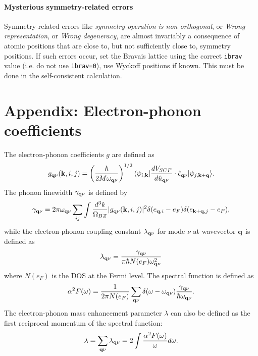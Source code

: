\documentclass[12pt,a4paper]{article}
\begin{document}
\paragraph{Mysterious symmetry-related errors} 
Symmetry-related errors like {\em symmetry operation is non orthogonal}, 
or {\em Wrong representation}, or {\em Wrong degeneracy}, are almost 
invariably a consequence of atomic positions that are close to, 
but not sufficiently close to, symmetry positions. If such errors occur,
set the Bravais lattice using the correct \texttt{ibrav} value (i.e. do
not use \texttt{ibrav=0}), use Wyckoff positions if known. This must be
done in the self-consistent calculation.

\appendix
\section{Appendix: Electron-phonon coefficients}

\def\r{{\bf r}}
\def\d{{\bf d}}
\def\k{{\bf k}}
\def\q{{\bf q}}
\def\G{{\bf G}}
\def\R{{\bf R}}

\noindent The electron-phonon coefficients $g$
are defined as
\begin{equation}
g_{\q\nu}(\k,i,j) =\left({\hbar\over 2M\omega_{\q\nu}}\right)^{1/2}
\langle\psi_{i,\k}| {dV_{SCF}\over d {\hat u}_{\q\nu} }\cdot
                   \hat \epsilon_{\q\nu}|\psi_{j,\k+\q}\rangle.
\end{equation}
The phonon linewidth $\gamma_{\q\nu}$ is defined by
\begin{equation}
\gamma_{\q\nu} = 2\pi\omega_{\q\nu} \sum_{ij}
                \int {d^3k\over \Omega_{BZ}}  |g_{\q\nu}(\k,i,j)|^2
                    \delta(e_{\q,i} - e_F)  \delta(e_{\k+\q,j} - e_F), 
\end{equation}
while the electron-phonon coupling constant $\lambda_{\q\nu}$ for
mode $\nu$ at wavevector $\q$ is defined as
\begin{equation}
\lambda_{\q\nu} ={\gamma_{\q\nu} \over \pi\hbar N(e_F)\omega^2_{\q\nu}}
\end{equation}
where $N(e_F)$ is the DOS at the Fermi level.
The spectral function is defined as
\begin{equation}
\alpha^2F(\omega) = {1\over 2\pi N(e_F)}\sum_{\q\nu} 
                    \delta(\omega-\omega_{\q\nu})
                    {\gamma_{\q\nu}\over\hbar\omega_{\q\nu}}.
\end{equation}
The electron-phonon mass enhancement parameter $\lambda$
can also be defined as the first reciprocal momentum of 
the spectral function:
\begin{equation}
\lambda = \sum_{\q\nu} \lambda_{\q\nu} = 
2 \int {\alpha^2F(\omega) \over \omega} d\omega.
\end{equation}
\end{document}

